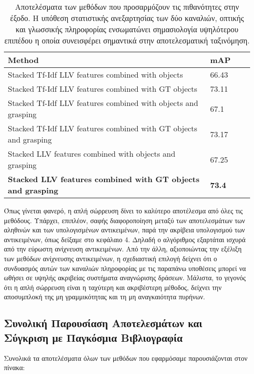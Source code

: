 \documentclass[11pt,a4paper,english,greek,twoside]{../Thesis}
\begin{document}
\begin{table}[H]
	\centering
    \begin{tabular}{| l | l | l | l |}
    \hline
    \textbf{Method} & \textbf{mAP} \\ \hline
    Stacked Tf-Idf LLV features combined with objects & 66.43 \\ \hline
    Stacked Tf-Idf LLV features combined with GT objects & 73.11 \\ \hline
    Stacked Tf-Idf LLV features combined with objects and grasping & 67.1 \\ \hline
    Stacked Tf-Idf LLV features combined with GT objects and grasping & 73.17 \\ \hline
    Stacked LLV features combined with objects and grasping & 67.25 \\ \hline
    \textbf{Stacked LLV features combined with GT objects and grasping} & \textbf{73.4} \\
    \hline
    \end{tabular}
	\label{tab:TuningResults}
	\caption{Αποτελέσματα των μεθόδων που προσαρμόζουν τις πιθανότητες στην έξοδο. Η υπόθεση στατιστικής ανεξαρτησίας των δύο καναλιών, οπτικής και γλωσσικής πληροφορίας ενσωματώνει σημασιολογία υψηλότερου επιπέδου η οποία συνεισφέρει σημαντικά στην αποτελεσματική ταξινόμηση.}
\end{table}

Όπως γίνεται φανερό, η απλή σώρρευση δίνει το καλύτερο αποτέλεσμα από όλες τις μεθόδους. Υπάρχει, επιπλέον, σαφής διαφοροποίηση μεταξύ των αποτελεσμάτων των αληθινών και των υπολογισμένων αντικειμένων, παρά την ακρίβεια υπολογισμού των αντικειμένων, όπως δείξαμε στο κεφάλαιο 4. Δηλαδή ο αλγόριθμος εξαρτάται ισχυρά από την εύρωστη ανίχνευση αντικειμένων. Από την άλλη, αξιοποιώντας την εξέλιξη των μεθόδων ανίχνευσης αντικειμένων, η σχεδιαστική επιλογή δείχνει ότι ο συνδυασμός αυτών των καναλιών πληροφορίας με τις παραπάνω υποθέσεις μπορεί να ωθήσει σε υψηλής ακριβείας συστήματα αναγνώρισης δράσεων. Μάλιστα, το γεγονός ότι η απλή σώρρευση είναι η ταχύτερη και ακριβέστερη μέθοδος, δείχνει την αποσυμπλοκή της μη γραμμικότητας και τη μη αναγκαιότητα πυρήνων.

\subsection{Συνολική Παρουσίαση Αποτελεσμάτων και Σύγκριση με Παγκόσμια Βιβλιογραφία}
Συνολικά τα αποτελέσματα όλων των μεθόδων που εφαρμόσαμε παρουσιάζονται στον πίνακα:
\end{document}
